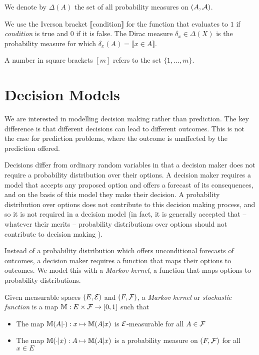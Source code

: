We denote by $\Delta(A)$ the set of all probability measures on $(A,\mathcal{A})$.

We use the Iverson bracket $\llbracket \mathrm{condition} \rrbracket$ for the function that evaluates to $1$ if \emph{condition} is true and $0$ if it is false. The Dirac measure $\delta_x \in \Delta(X)$ is the probability measure for which $\delta_x(A) = \llbracket x\in A \rrbracket$.

A number in square brackets $[m]$ refers to the set $\{1, ..., m \}$.

\section{Decision Models}

We are interested in modelling decision making rather than prediction. The key difference is that different decisions can lead to different outcomes. This is not the case for prediction problems, where the outcome is unaffected by the prediction offered.

Decisions differ from ordinary random variables in that a decision maker does not require a probability distribution over their options. A decision maker requires a model that accepts any proposed option and offers a forecast of its consequences, and on the basis of this model they make their decision. A probability distribution over options does not contribute to this decision making process, and so it is not required in a decision model (in fact, it is generally accepted that -- whatever their merits -- probability distributions over options should not contribute to decision making \citet{liu_ramsey_2020}).

Instead of a probability distribution which offers unconditional forecasts of outcomes, a decision maker requires a function that maps their options to outcomes. We model this with a \emph{Markov kernel}, a function that maps options to probability distributions.

\begin{definition}\label{def:markov_kern}
Given measurable spaces $(E,\mathcal{E})$ and $(F,\mathcal{F})$, a \emph{Markov kernel} or \emph{stochastic function} is a map $\mathbb{M}:E\times\mathcal{F}\to [0,1]$ such that
\begin{itemize}
	\item The map $\mathbb{M}(A|\cdot):x\mapsto \mathbb{M}(A|x)$ is $\mathcal{E}$-measurable for all $A\in \mathcal{F}$
	\item The map $\mathbb{M}(\cdot|x):A\mapsto \mathbb{M}(A|x)$ is a probability measure on $(F,\mathcal{F})$ for all $x\in E$
\end{itemize}
\end{definition}

